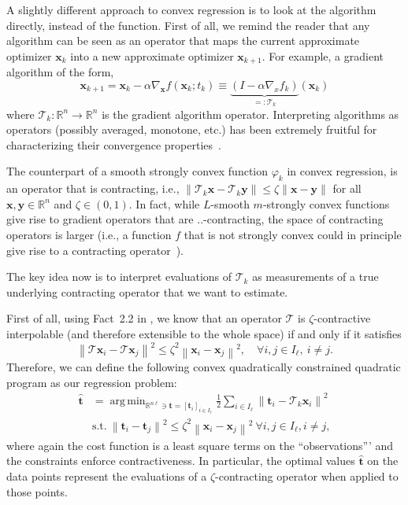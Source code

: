 \documentclass{article}
\DeclareMathOperator*{\argmin}{arg\,min}
\newcommand{\norm}[1]{\left\lVert#1\right\rVert}
\newcommand{\R}{\mathbb{R}}
\newcommand{\tv}{\mathbold{t}}
\newcommand{\x}{\mathbold{x}}
\newcommand{\y}{\mathbold{y}}
\newcommand{\T}{\mathcal{T}}
\begin{document}
A slightly different approach to convex regression is to look at the algorithm directly, instead of the function. First of all, we remind the reader that any algorithm can be seen as an operator that maps the current approximate optimizer $\x_k$ into a new approximate optimizer $\x_{k+1}$. For example, a gradient algorithm of the form,
\begin{equation}
\x_{k+1} = \x_k - \alpha \nabla_{\x} f(\x_k; t_k) \equiv \underbrace{(I - \alpha \nabla_{x}f_k)}_{=:\T_k} (\x_k)
\end{equation}
where $\T_k: \R^n \to \R^n$ is the gradient algorithm operator. Interpreting algorithms as operators (possibly averaged, monotone, etc.) has been extremely fruitful for characterizing their convergence properties~\cite{Rockafellar1976, Eckstein1989, bauschke_convex_2017,Ryu2015,tom-also}. 

The counterpart of a smooth strongly convex function $\varphi_k$ in convex regression, is an operator that is contracting, i.e., $\|\T_k \x - \T_k \y\| \leq \zeta \|\x - \y\|$ for all $\x, \y \in \R^n$ and $\zeta \in (0,1)$. In fact, while $L$-smooth $m$-strongly convex functions give rise to gradient operators that are $..$-contracting, the space of contracting operators is larger (i.e., a function $f$ that is not strongly convex could in principle give rise to a contracting operator~\cite{linear}). 

The key idea now is to interpret evaluations of $\T_k$ as measurements of a true underlying contracting operator that we want to estimate. 
 

First of all, using Fact~2.2 in \cite{ryu_operator_2020}, we know that an operator $\T$ is $\zeta$-contractive interpolable (and therefore extensible to the whole space) if and only if it satisfies
\begin{equation}
	\norm{\T \x_i - \T \x_j}^2 \leq \zeta^2 \norm{\x_i - \x_j}^2, \quad \forall i,j \in I_{\ell}, \ i \neq j.
\end{equation}
Therefore, we can define the following convex quadratically constrained quadratic program as our regression problem:
\begin{equation}\label{eq:operator-regression}
\begin{split}
	\hat{\tv} &= \argmin_{ \R^{n\ell} \ni \tv = [\tv_i]_{i \in I_{\ell}}} \frac{1}{2} \sum_{i \in I_{\ell}} \norm{\tv_i - \T_k \x_i}^2 \\
	&\text{s.t.} \ \norm{\tv_i - \tv_j}^2 \leq \zeta^2 \norm{\x_i - \x_j}^2 \ \forall i,j \in I_{\ell}, i \neq j,
\end{split}
\end{equation}
where again the cost function is a least square terms on the ``observations''' and the constraints enforce contractiveness. In particular, the optimal values $\hat{\tv}$ on the data points represent the evaluations of a $\zeta$-contracting operator when applied to those points. 
\end{document}
